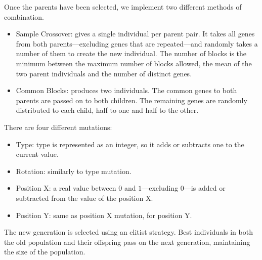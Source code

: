 Once the parents have been selected, we implement two different methods of combination.
\begin{itemize}
	\item Sample Crossover: gives a single individual per parent pair. It takes all genes from both parents---excluding genes that are repeated---and randomly takes a number of them to create the new individual. The number of blocks is the minimum between the maximum number of blocks allowed, the mean of the two parent individuals and the number of distinct genes.
	\item Common Blocks: produces two individuals. The common genes to both parents are passed on to both children. The remaining genes are randomly distributed to each child, half to one and half to the other. \label{ga:cross2}
\end{itemize}

There are four different mutations:

\begin{itemize}
	\item Type: type is represented as an integer, so it adds or subtracts one to the current value.
	\item Rotation: similarly to type mutation.
	\item Position X: a real value between $0$ and $1$---excluding $0$---is added or subtracted from the value of the position X.
	\item Position Y: same as position X mutation, for position Y.
\end{itemize}

The new generation is selected using an elitist strategy. Best individuals in both the old population and their offspring pass on the next generation, maintaining the size of the population.



